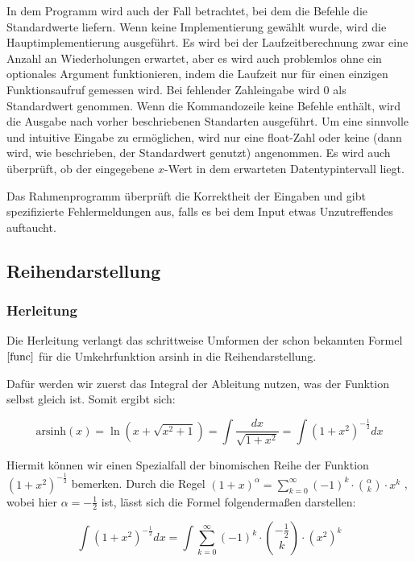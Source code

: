 \documentclass[course=erap]{aspdoc}
\begin{document}
     In dem Programm wird auch der Fall betrachtet, bei dem die Befehle die Standardwerte liefern. Wenn keine Implementierung gewählt wurde, wird die Hauptimplementierung ausgeführt. Es wird bei der Laufzeitberechnung zwar eine Anzahl an Wiederholungen erwartet, aber es wird auch problemlos ohne ein optionales Argument funktionieren, indem die Laufzeit nur für einen einzigen Funktionsaufruf gemessen wird. Bei fehlender Zahleingabe wird $0$ als Standardwert genommen. Wenn die Kommandozeile keine Befehle enthält, wird die Ausgabe nach vorher beschriebenen Standarten ausgeführt. 
     Um eine sinnvolle und intuitive Eingabe zu ermöglichen, wird nur eine float-Zahl oder keine (dann wird, wie beschrieben, der Standardwert genutzt) angenommen. Es wird auch überprüft, ob der eingegebene $x$-Wert in dem erwarteten Datentypintervall liegt. 
     
     Das Rahmenprogramm überprüft die Korrektheit der Eingaben und gibt spezifizierte Fehlermeldungen aus, falls es bei dem Input etwas Unzutreffendes auftaucht.
    
    \subsection{Reihendarstellung}
    \subsubsection{Herleitung}
    
    Die Herleitung verlangt das schrittweise Umformen der schon bekannten Formel $\eqref{func}$ für die Umkehrfunktion arsinh in die Reihendarstellung.
    
    Dafür werden wir zuerst das Integral der Ableitung nutzen, was der Funktion selbst gleich ist. Somit ergibt sich:
    
    \begin{equation}
        \text{arsinh}(x) = \ln(x + \sqrt{x^2 + 1}) = \int \frac{dx}{\sqrt{1+x^2}} = \int (1+x^2)^{-\frac{1}{2}} dx
    \end{equation}
    
    Hiermit können wir einen Spezialfall der binomischen Reihe der Funktion $(1+x^2)^{-\frac{1}{2}}$ bemerken. Durch die Regel $(1+x)^{\alpha} = \sum_{k=0}^{\infty} (-1)^k \cdot \binom{\alpha}{k} \cdot x^k$ , wobei hier $\alpha = -\frac{1}{2}$ ist, lässt sich die Formel folgendermaßen darstellen:
    
    \begin{equation}
        \int (1+x^2)^{-\frac{1}{2}} dx = \int \sum_{k=0}^{\infty} (-1)^k \cdot \binom{-\frac{1}{2}}{k} \cdot (x^2)^k
    \end{equation}
 
\end{document}
